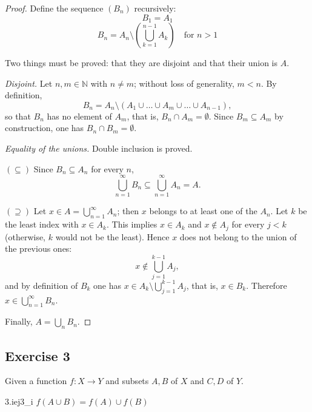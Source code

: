 \documentclass[11pt, a4paper]{article}
\begin{document}
\begin{proof}
Define the sequence $(B_n)$ recursively:
$$ B_1 = A_1 $$
$$ B_n = A_n \setminus \left( \bigcup_{k=1}^{n-1} A_k \right) \quad \text{for } n > 1 $$

Two things must be proved: that they are disjoint and that their union is $A$.

\textit{Disjoint.} Let $n, m \in \mathbb{N}$ with $n \neq m$; without loss of generality, $m < n$.
By definition,
$$ B_n = A_n \setminus (A_1 \cup \dots \cup A_m \cup \dots \cup A_{n-1}), $$
so that $B_n$ has no element of $A_m$, that is, $B_n \cap A_m = \emptyset$. Since
$B_m \subseteq A_m$ by construction, one has $B_n \cap B_m = \emptyset$.

\textit{Equality of the unions.} Double inclusion is proved.

$(\subseteq)$ Since $B_n \subseteq A_n$ for every $n$,
$$ \bigcup_{n=1}^{\infty} B_n \subseteq \bigcup_{n=1}^{\infty} A_n = A. $$

$(\supseteq)$ Let $x \in A = \bigcup_{n=1}^{\infty} A_n$; then $x$ belongs to at least one of the
$A_n$. Let $k$ be the least index with $x \in A_k$. This implies $x \in A_k$ and $x \notin A_j$ for every
$j < k$ (otherwise, $k$ would not be the least). Hence $x$ does not belong to the union of the previous ones:
$$ x \notin \bigcup_{j=1}^{k-1} A_j, $$
and by definition of $B_k$ one has $x \in A_k \setminus \bigcup_{j=1}^{k-1} A_j$, that is,
$x \in B_k$. Therefore $x \in \bigcup_{n=1}^{\infty} B_n$.

Finally, $A=\bigcup_{n}B_{n}$.
\end{proof}

\subsection*{Exercise 3}

Given a function $f:X\longrightarrow Y$ and subsets $A, B$ of $X$ and $C, D$ of $Y$.

\begin{proposicion}{3.i}{ej3_i}
$f(A\cup B)=f(A)\cup f(B)$
\end{proposicion}
\end{document}

